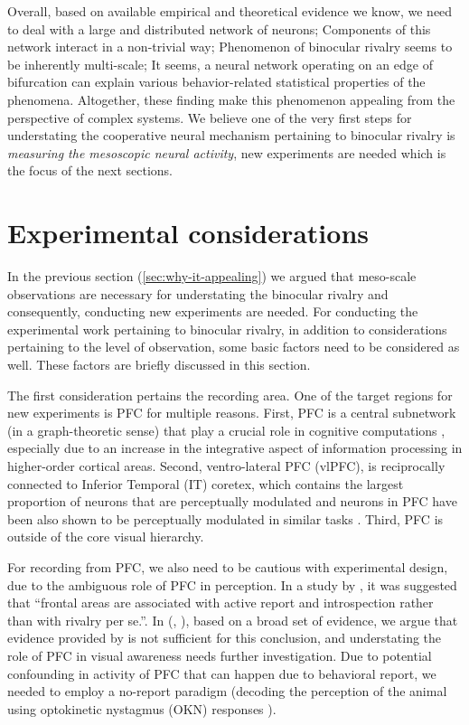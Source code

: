 Overall, based on available empirical and theoretical evidence we know, we need to deal with a large and distributed network of neurons;
Components of this network interact in a non-trivial way;
Phenomenon of binocular rivalry seems to be inherently multi-scale;
It seems, a neural network operating on an edge of bifurcation can explain various behavior-related statistical properties of the phenomena. 
Altogether, these finding make this phenomenon appealing from the perspective of complex systems.
We believe one of the very first steps for understating the cooperative neural mechanism pertaining to
binocular rivalry is \emph{measuring the mesoscopic neural activity},
\ie new experiments are needed which is the focus of the next sections.

\section{Experimental considerations} \label{sec:exper-cons}
In the previous section (\autoref{sec:why-it-appealing}) we argued that
meso-scale observations are necessary for understating the binocular rivalry  and
consequently, conducting new experiments are needed.
For conducting the  experimental work pertaining to binocular rivalry,
in addition to considerations pertaining to the level of observation,
some basic factors need to be considered as well.
These factors are briefly discussed in this section.

The first consideration pertains the recording area.
One of the target regions for new experiments is PFC for multiple reasons.
First, 
PFC is a central subnetwork (in a graph-theoretic sense)  \citep{modhaNetworkArchitectureLongdistance2010} that play a crucial role in cognitive computations \citep{millerIntegrativeTheoryPrefrontal2001},
especially due to an increase in the integrative aspect of information processing in higher-order cortical areas.
Second, ventro-lateral PFC (vlPFC), is reciprocally connected to Inferior Temporal (IT) coretex,
which contains the largest proportion of neurons that are perceptually modulated \citep{sheinbergRoleTemporalCortical1997} and neurons in PFC have been also shown to be perceptually modulated in similar tasks \citep{panagiotaropoulosNeuronalDischargesGamma2012,hesseNewNoreportParadigm2020}.
Third, PFC is outside of the core visual hierarchy.

For recording from PFC, we also need to be cautious with experimental design,
due to the ambiguous role of PFC in perception.
In a study by \citet{frassleBinocularRivalryFrontal2014},
it was suggested that ``frontal areas are associated with active report and introspection rather than with rivalry per se.''.
In \citet{safaviFrontalLobeInvolved2014} (\seealso, ), based on a broad set of evidence,
we argue that evidence provided by \citet{frassleBinocularRivalryFrontal2014} is not sufficient for this conclusion, and understating the role of PFC in visual awareness needs further investigation.
Due to potential confounding in activity of PFC that can happen due to behavioral report,
we needed to employ a no-report paradigm (decoding the perception of the animal using optokinetic nystagmus (OKN) responses \citep{leopoldMeasuringSubjectiveVisual2003}).

